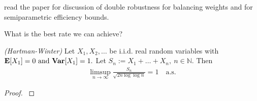 read the paper \cite{Zhao2017a} for discussion of double robustness for balancing weights and \cite{Hahn1998} for semiparametric efficiency bounds.


What is the best rate we can achieve?

\begin{theorem}
  \emph{(Hartman-Winter)}
  Let 
  $
    X_1,
    X_2,
    \ldots
  $
  be i.i.d. real random variables with 
  $
    \E[X_1]=0
    \ 
    \text{and}
    \ 
    \mathbf{Var}
    [X_1]
    = 1.
  $
  Let
  $
    S_n
    :=
    X_1
    +
    \ldots
    +
    X_n,
    \ 
    n\in \mathbb{N}
    .
  $
  Then
  \begin{gather}
    \limsup_{n\to\infty}
    \frac{S_n}{
      \sqrt{
        2n
        \log
        \log
        n
      }
    }
    =
    1
    \quad
    \text{a.s.}
  \end{gather}
\end{theorem}
\begin{proof}
  \cite[Theorem~22.11]{Klenke2020}
\end{proof}
